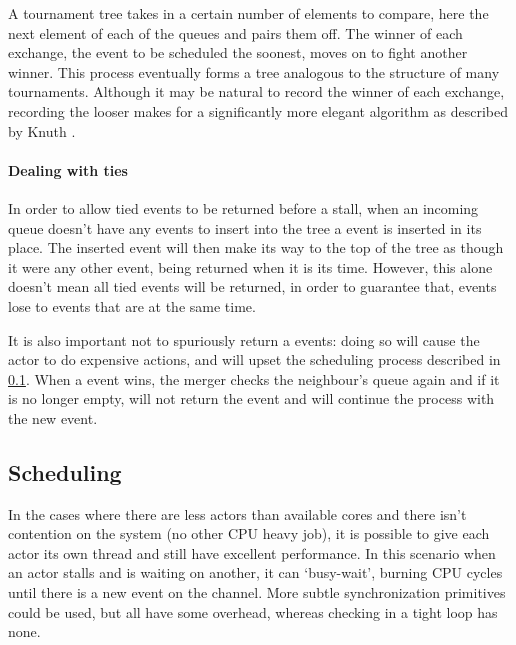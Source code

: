 A tournament tree takes in a certain number of elements to compare, here the next element of each of the queues and pairs them off.
The winner of each exchange, the event to be scheduled the soonest, moves on to fight another winner.
This process eventually forms a tree analogous to the structure of many tournaments.
Although it may be natural to record the winner of each exchange, recording the looser makes for a significantly more elegant algorithm as described by Knuth \cite{knuth_art_1998}.

\paragraph{Dealing with ties}
In order to allow tied events to be returned before a stall, when an incoming queue doesn't have any events to insert into the tree a  event is inserted in its place.
The inserted event will then make its way to the top of the tree as though it were any other event, being returned when it is its time.
However, this alone doesn't mean all tied events will be returned, in order to guarantee that,  events lose to events that are at the same time.

It is also important not to spuriously return a  events: doing so will cause the actor to do expensive actions, and will upset the scheduling process described in \ref{rustasim-sched}.
When a  event wins, the merger checks the neighbour's queue again and if it is no longer empty, will not return the  event and will continue the process with the new event.


\subsection{Scheduling} \label{rustasim-sched}

In the cases where there are less actors than available cores and there isn't contention on the system (no other CPU heavy job), it is possible to give each actor its own thread and still have excellent performance.
In this scenario when an actor stalls and is waiting on another, it can `busy-wait', burning CPU cycles until there is a new event on the channel.
More subtle synchronization primitives could be used, but all have some overhead, whereas checking in a tight loop has none.


